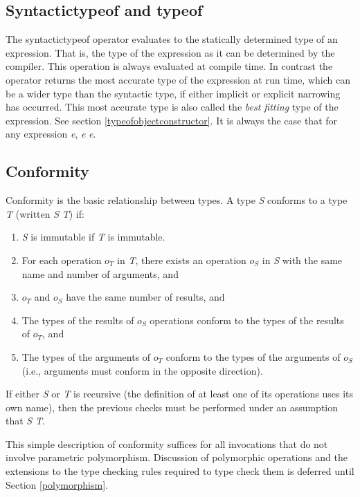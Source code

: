 \subsection{Syntactictypeof and typeof}
\label{syntactictypeof}
\label{syntactictype}
The syntactictypeof operator evaluates to the statically determined type of
an expression.  That is, the type of the expression as it can be determined
by the compiler.  This operation is always evaluated at compile time.  In
contrast the  operator returns the most
accurate type of the expression at run time, which can be a wider type than
the syntactic type, if either implicit or explicit narrowing has occurred.
This most accurate type is 
also called the {\it best fitting} type of the expression.
See section \ref{typeofobjectconstructor}.  It is always the case that for
any expression {\it e},  {\it e} \conforms {} {\it e}.

\subsection{Conformity}
\label{conformity}
Conformity is the basic relationship between types.  
A type 
{\it S}
conforms to a type 
{\it T}
(written 
{\it S}
\conforms{} 
{\it T}\/) 
if:
\begin{enumerate}
  \item{} {\it S} is immutable if {\it T} is immutable.
  \item{} For each operation $o_T$ in {\it T},
    there exists an operation $o_S$ in {\it S} with the same name and number
    of arguments, and
  \item{} $o_T$ and $o_S$ have the same number of results, and
  \item{} The  types of the results of $o_S$ operations conform to the
    types of the results of $o_T$, and 
  \item{} The  types of the arguments of $o_T$ conform to the  types of the
    arguments of $o_S$ (i.e., arguments must conform in the opposite
    direction). 
\end{enumerate}

If either {\it S} or {\it T} is recursive (the definition of at least one of
its operations uses its own name), then the previous checks must be
performed under an assumption that {\it S} \conforms{} {\it T}.

This simple description of conformity suffices for all invocations that
do not involve parametric polymorphism.  Discussion of polymorphic
operations and the extensions to the type checking rules required to type
check them is deferred until Section \ref{polymorphism}.

